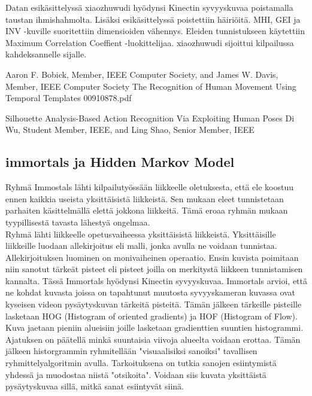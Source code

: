 Datan esikäsittelyssä xiaozhuwudi hyödynsi Kinectin syvyyskuvaa poistamalla taustan ihmishahmolta. Lisäksi esikäsittelyssä poistettiin häiriöitä.
MHI, GEI ja INV -kuville suoritettiin dimensioiden vähennys. Eleiden tunnistukseen käytettiin Maximum Correlation Coeffient -luokittelijaa.
xiaozhuwudi sijoittui kilpailussa kahdeksannelle sijalle.


Aaron F. Bobick, Member, IEEE Computer Society, and
James W. Davis, Member, IEEE Computer Society
The Recognition of Human Movement Using Temporal Templates
00910878.pdf

Silhouette Analysis-Based Action Recognition Via
Exploiting Human Poses
Di Wu, Student Member, IEEE, and Ling Shao, Senior Member, IEEE


\subsection{immortals ja Hidden Markov Model}

Ryhmä Immostals lähti kilpailutyössään liikkeelle oletuksesta, että ele koostuu ennen kaikkia useista yksittäisistä liikkeistä. 
Sen mukaan eleet tunnistetaan parhaiten käsittelmällä elettä jokkona liikkeitä. Tämä eroaa ryhmän mukaan tyypillisestä 
tavasta lähestyä ongelmaa.\\

Ryhmä lähti liikkeelle opetusvaiheessa yksittäisistä liikkeistä. Yksittäisille liikkeille luodaan allekirjoitus eli malli,
jonka avulla ne voidaan tunnistaa. Allekirjoituksen luominen on monivaiheinen operaatio. Ensin kuvista poimitaan niin sanotut
tärkeät pisteet eli pisteet joilla on merkitystä liikkeen tunnistamisen kannalta. Tässä Immortals hyödynsi Kinectin syvyyskuvaa.
Immortals arvioi, että ne kohdat kuvasta joissa on tapahtunut muutosta syvyyskameran kuvassa ovat kyseisen videon pysäytyskuvan
tärkeitä pisteitä. Tämän jälkeen tärkeille pisteille lasketaan HOG (Histogram of oriented gradients) ja HOF (Histogram of Flow). 
Kuva jaetaan pieniin alueisiin joille lasketaan gradienttien suuntien histogrammi. Ajatuksen on päätellä minkä suuntaisia 
viivoja alueelta voidaan erottaa. Tämän jälkeen historgrammin ryhmitellään "visuaalisiksi sanoiksi" tavallisen ryhmittelyalgoritmin avulla.
Tarkoituksena on tutkia sanojen esiintymistä yhdessä ja muodostaa niistä "otsikoita". Voidaan siis kuvata yksittäistä pysäytyskuvaa
sillä, mitkä sanat esiintyvät siinä.\\

